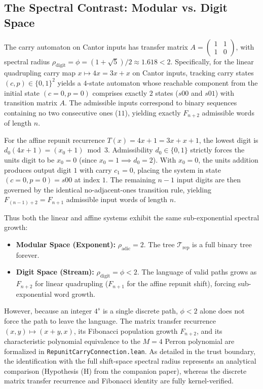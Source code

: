 \documentclass[11pt,reqno]{amsart}
\theoremstyle{plain}
\theoremstyle{definition}
\theoremstyle{remark}
\newcommand{\Trep}{\mathcal{T}_{\mathrm{rep}}}
\begin{document}
\subsection{The Spectral Contrast: Modular vs. Digit Space}
The carry automaton on Cantor inputs has transfer matrix $A = \begin{pmatrix} 1 & 1 \\ 1 & 0 \end{pmatrix}$, with spectral radius $\rho_{\mathrm{digit}} = \phi = (1+\sqrt{5})/2 \approx 1.618 < 2$. Specifically, for the linear quadrupling carry map $x \mapsto 4x = 3x + x$ on Cantor inputs, tracking carry states $(c, p) \in \{0, 1\}^2$ yields a $4$-state automaton whose reachable component from the initial state $(c=0, p=0)$ comprises exactly $2$ states ($s00$ and $s01$) with transition matrix $A$. The admissible inputs correspond to binary sequences containing no two consecutive ones ($11$), yielding exactly $F_{n+2}$ admissible words of length $n$.

For the affine repunit recurrence $T(x) = 4x + 1 = 3x + x + 1$, the lowest digit is $d_0(4x+1) = (x_0 + 1) \bmod 3$. Admissibility $d_0 \in \{0, 1\}$ strictly forces the units digit to be $x_0 = 0$ (since $x_0 = 1 \implies d_0 = 2$). With $x_0 = 0$, the units addition produces output digit $1$ with carry $c_1 = 0$, placing the system in state $(c=0, p=0) = s00$ at index $1$. The remaining $n-1$ input digits are then governed by the identical no-adjacent-ones transition rule, yielding $F_{(n-1)+2} = F_{n+1}$ admissible input words of length $n$. 

Thus both the linear and affine systems exhibit the same sub-exponential spectral growth:
\begin{itemize}
    \item \textbf{Modular Space (Exponent):} $\rho_{\mathrm{adic}} = 2$. The tree $\Trep$ is a full binary tree forever.
    \item \textbf{Digit Space (Stream):} $\rho_{\mathrm{digit}} = \phi < 2$. The language of valid paths grows as $F_{n+2}$ for linear quadrupling ($F_{n+1}$ for the affine repunit shift), forcing sub-exponential word growth.
\end{itemize}
However, because an integer $4^s$ is a single discrete path, $\phi < 2$ alone does not force the path to leave the language. The matrix transfer recurrence $(x, y) \mapsto (x+y, x)$, its Fibonacci population growth $F_{n+2}$, and its characteristic polynomial equivalence to the $M=4$ Perron polynomial are formalized in \texttt{RepunitCarryConnection.lean}. As detailed in the trust boundary, the identification with the full shift-space spectral radius represents an analytical comparison (Hypothesis (H) from the companion paper), whereas the discrete matrix transfer recurrence and Fibonacci identity are fully kernel-verified.
\end{document}
